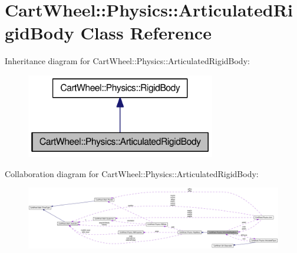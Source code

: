 \hypertarget{classCartWheel_1_1Physics_1_1ArticulatedRigidBody}{
\section{CartWheel::Physics::ArticulatedRigidBody Class Reference}
\label{classCartWheel_1_1Physics_1_1ArticulatedRigidBody}
}


Inheritance diagram for CartWheel::Physics::ArticulatedRigidBody:\nopagebreak
\begin{figure}[H]
\begin{center}
\leavevmode
\includegraphics[width=234pt]{classCartWheel_1_1Physics_1_1ArticulatedRigidBody__inherit__graph}
\end{center}
\end{figure}


Collaboration diagram for CartWheel::Physics::ArticulatedRigidBody:\nopagebreak
\begin{figure}[H]
\begin{center}
\leavevmode
\includegraphics[width=400pt]{classCartWheel_1_1Physics_1_1ArticulatedRigidBody__coll__graph}
\end{center}
\end{figure}

